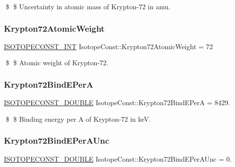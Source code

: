 \$ \$ Uncertainty in atomic mass of Krypton-\/72 in amu. \mbox{\label{group___isotope_const-_krypton-_kr72_ga2778006c03bbeddb299818de4ba941b6}} 
\subsubsection{\texorpdfstring{Krypton72\+Atomic\+Weight}{Krypton72AtomicWeight}}
{\footnotesize\ttfamily \mbox{\hyperlink{group___isotope_const-_macros_ga5f18360b3e99483a35c32d789e62621c}{I\+S\+O\+T\+O\+P\+E\+C\+O\+N\+S\+T\+\_\+\+I\+NT}} Isotope\+Const\+::\+Krypton72\+Atomic\+Weight = 72}

\$ \$ Atomic weight of Krypton-\/72. \mbox{\label{group___isotope_const-_krypton-_kr72_ga8660c7a2b70eb0b21db3c6457c91056b}} 
\subsubsection{\texorpdfstring{Krypton72\+Bind\+E\+PerA}{Krypton72BindEPerA}}
{\footnotesize\ttfamily \mbox{\hyperlink{group___isotope_const-_macros_ga8f45a7272ce02c0b4c65c44636ed719a}{I\+S\+O\+T\+O\+P\+E\+C\+O\+N\+S\+T\+\_\+\+D\+O\+U\+B\+LE}} Isotope\+Const\+::\+Krypton72\+Bind\+E\+PerA = 8429.}

\$ \$ Binding energy per A of Krypton-\/72 in keV. \mbox{\label{group___isotope_const-_krypton-_kr72_ga66f7e364eccaa76a7ea3f8fc28facfee}} 
\subsubsection{\texorpdfstring{Krypton72\+Bind\+E\+Per\+A\+Unc}{Krypton72BindEPerAUnc}}
{\footnotesize\ttfamily \mbox{\hyperlink{group___isotope_const-_macros_ga8f45a7272ce02c0b4c65c44636ed719a}{I\+S\+O\+T\+O\+P\+E\+C\+O\+N\+S\+T\+\_\+\+D\+O\+U\+B\+LE}} Isotope\+Const\+::\+Krypton72\+Bind\+E\+Per\+A\+Unc = 0.}

